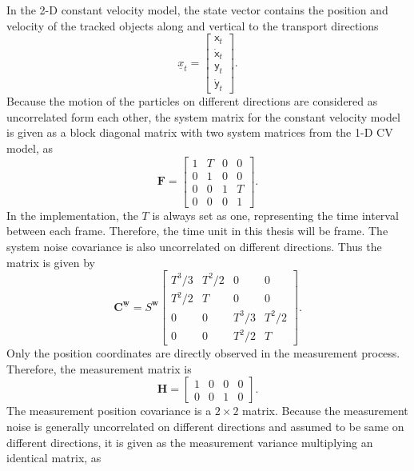 In the 2-D constant velocity model, the state vector contains the position and velocity of the tracked objects along and vertical to the transport directions
\begin{equation}
    \underline{x}_{t}=
    \begin{bmatrix}
        \mathsf{x}_{t}\\ 
        \dot{\mathsf{x}}_{t}\\ 
        \mathsf{y}_{t}\\ 
        \dot{\mathsf{y}}_{t}
    \end{bmatrix}.
\end{equation}
Because the motion of the particles on different directions are considered as uncorrelated form each other, the system matrix for the constant velocity model is given as a block diagonal matrix with two system matrices from the 1-D CV model, as
\begin{equation}
    \mathbf{F}=\begin{bmatrix}
     1 & T & 0 & 0 \\ 
     0 & 1 & 0 & 0 \\ 
     0 & 0 & 1 & T \\ 
     0 & 0 & 0 & 1 
    \end{bmatrix}.
\end{equation}
In the implementation, the $T$ is always set as one, representing the time interval between each frame. Therefore, the time unit in this thesis will be frame.
The system noise covariance is also uncorrelated on different directions. Thus the matrix is given by
\begin{equation}
    \mathbf{C}^{\underline{\boldsymbol{w}}}=S^{\boldsymbol{w}}
    \begin{bmatrix}
     T^3/3 & T^2/2 & 0 & 0 \\ 
     T^2/2 & T     & 0 & 0 \\ 
     0 & 0 & T^3/3 & T^2/2 \\ 
     0 & 0 & T^2/2 & T 
    \end{bmatrix}.
\end{equation}
Only the position coordinates are directly observed in the measurement process. Therefore, the measurement matrix is
\begin{equation}
    \mathbf{H}=\begin{bmatrix}
     1 & 0 & 0 & 0 \\ 
     0 & 0 & 1 & 0 
    \end{bmatrix} .
\end{equation}
The measurement position covariance is a $2\times 2$ matrix. Because the measurement noise is generally uncorrelated on different directions and assumed to be same on different directions, it is given as the measurement variance multiplying an identical matrix, as
